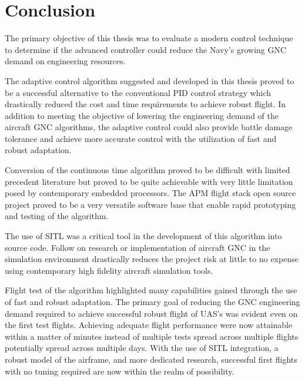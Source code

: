 \chapter{Conclusion}\label{ch:conclusion}

The primary objective of this thesis was to evaluate a modern control technique to determine if the advanced controller could reduce the Navy's growing \ac{GNC} demand on engineering resources.  

The \Lone adaptive control algorithm suggested and developed in this thesis proved to be a successful alternative to the conventional \ac{PID} control strategy which drastically reduced the cost and time requirements to achieve robust flight.  In addition to meeting the objective of lowering the engineering demand of the aircraft \ac{GNC} algorithms, the \Lone adaptive control could also provide battle damage tolerance and achieve more accurate control with the utilization of fast and robust adaptation.

Conversion of the continuous time \Lone algorithm proved to be difficult with limited precedent literature but proved to be quite achievable with very little limitation posed by contemporary embedded processors.  The \ac{APM} flight stack open source project proved to be a very versatile software base that enable rapid prototyping and testing of the \Lone algorithm.  

The use of \ac{SITL} was a critical tool in the development of this algorithm into source code.  Follow on research or implementation of aircraft \ac{GNC} in the simulation environment drastically reduces the project risk at little to no expense using contemporary high fidelity aircraft simulation tools.

Flight test of the \Lone algorithm highlighted many capabilities gained through the use of fast and robust adaptation.  The primary goal of reducing the \ac{GNC} engineering demand required to achieve successful robust flight of \ac{UAS}'s was evident even on the first test flights.  Achieving adequate flight performance were now attainable within a matter of minutes instead of multiple tests spread across multiple flights potentially spread across multiple days.  With the use of \ac{SITL} integration, a robust model of the airframe, and more dedicated research, successful first flights with no tuning required are now within the realm of possibility.




